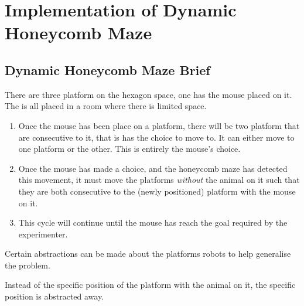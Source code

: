 \section{Implementation of Dynamic Honeycomb Maze}

\subsection{Dynamic Honeycomb Maze Brief}

There are three platform on the hexagon space, one has the mouse placed on it. The is all placed in a room where there is limited space.

\begin{enumerate}
    \item Once the mouse has been place on a platform, there will be two platform that are consecutive to it, that is has the choice to move to. It can either move to one platform or the other. This is entirely the mouse's choice.
    \item Once the mouse has made a choice, and the honeycomb maze has detected this movement, it must move the platforms \textit{without} the animal on it such that they are both consecutive to the (newly positioned) platform with the mouse on it.
    \item This cycle will continue until the mouse has reach the goal required by the experimenter.
\end{enumerate}


Certain abstractions can be made about the platforms robots to help generalise the problem.


Instead of the specific position of the platform with the animal on it, the specific position is abstracted away. 

